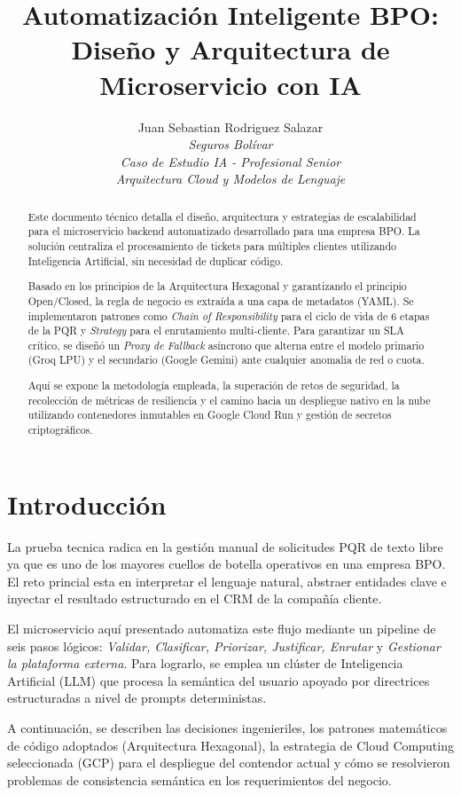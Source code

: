 \documentclass[twocolumn]{article}
\title{\textbf{Automatización Inteligente BPO: Diseño y Arquitectura de Microservicio con IA}}
\author{
    Juan Sebastian Rodriguez Salazar \\
    \textit{Seguros Bolívar}\\
    \textit{Caso de Estudio IA - Profesional Senior}\\
    \textit{Arquitectura Cloud y Modelos de Lenguaje}
}
\date{}
\numberwithin{definition}{subsection}
\begin{document}
\maketitle

\begin{abstract}
Este documento técnico detalla el diseño, arquitectura y estrategias de escalabilidad para el microservicio backend automatizado desarrollado para una empresa BPO. La solución centraliza el procesamiento de tickets  para múltiples clientes utilizando Inteligencia Artificial, sin necesidad de duplicar código.

Basado en los principios de la Arquitectura Hexagonal y garantizando el principio Open/Closed, la regla de negocio es extraída a una capa de metadatos (YAML). Se implementaron patrones como \textit{Chain of Responsibility} para el ciclo de vida de 6 etapas de la PQR y \textit{Strategy} para el enrutamiento multi-cliente. Para garantizar un SLA crítico, se diseñó un \textit{Proxy de Fallback} asíncrono que alterna entre el modelo primario (Groq LPU) y el secundario (Google Gemini) ante cualquier anomalía de red o cuota. 

Aquí se expone la metodología empleada, la superación de retos de seguridad, la recolección de métricas de resiliencia y el camino hacia un despliegue nativo en la nube utilizando contenedores inmutables en Google Cloud Run y gestión de secretos criptográficos.
\end{abstract}

\section{Introducción}

La prueba tecnica radica en la gestión manual de solicitudes PQR de texto libre ya que es uno de los mayores cuellos de botella operativos en una empresa BPO. El reto princial esta en interpretar el lenguaje natural, abstraer entidades clave e inyectar el resultado estructurado en el CRM de la compañía cliente. 

El microservicio aquí presentado automatiza este flujo mediante un pipeline de seis pasos lógicos: \textit{Validar, Clasificar, Priorizar, Justificar, Enrutar} y \textit{Gestionar la plataforma externa}. Para lograrlo, se emplea un clúster de Inteligencia Artificial (LLM) que procesa la semántica del usuario apoyado por directrices estructuradas a nivel de prompts deterministas.

A continuación, se describen las decisiones ingenieriles, los patrones matemáticos de código adoptados (Arquitectura Hexagonal), la estrategia de Cloud Computing seleccionada (GCP) para el despliegue del contendor actual y cómo se resolvieron problemas de consistencia semántica en los requerimientos del negocio.
\end{document}
